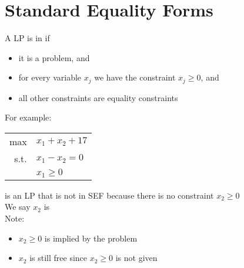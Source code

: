 \documentclass[letterpaper, 12pt]{article}
\newcommand{\red}[1]{{\color{red}{#1}}}
\begin{document}
    \pagebreak
    \section{Standard Equality Forms}
    A LP is in \red{Standard Equality Form (SEF)} if
    \begin{itemize}
        \item it is a \red{maximization} problem, and
        \item for every variable $x_j$ we have the constraint $x_j \geq 0$, and
        \item all other constraints are equality constraints
    \end{itemize}

    For example:
    \begin{center}
        \begin{tabular}{rl}
            max & $x_1 + x_2 + 17$\\
            s.t. & $x_1 - x_2 = 0$\\
            & $x_1 \geq 0$\\
        \end{tabular}
    \end{center}

    is an LP that is not in SEF because there is no constraint $x_2 \geq 0$\\
    We say $x_2$ is \red{free}\\
    \bigskip
    Note:\\
    \begin{itemize}
        \item $x_2 \geq 0$ is implied by the problem
        \item $x_2$ is still free since $x_2 \geq 0$ is not given \red{explicitly}
    \end{itemize}
\end{document}
